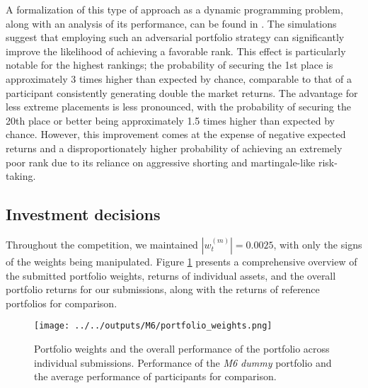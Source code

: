 \documentclass[3p,times,twocolumn]{elsarticle}
\begin{document}
A formalization of this type of approach as a dynamic programming problem, along with an analysis of its performance, can be found in \citep{stanekNoteM6Forecasting2023a}.
The simulations suggest that employing such an adversarial portfolio strategy can significantly improve the likelihood of achieving a favorable rank.
This effect is particularly notable for the highest rankings; the probability of securing the 1st place is approximately 3 times higher than expected by chance, comparable to that of a participant consistently generating double the market returns.
The advantage for less extreme placements is less pronounced, with the probability of securing the 20th place or better being approximately 1.5 times higher than expected by chance.
However, this improvement comes at the expense of negative expected returns and a disproportionately higher probability of achieving an extremely poor rank due to its reliance on aggressive shorting and martingale-like risk-taking.

\subsection{Investment decisions}\label{subsection:decisions}

Throughout the competition, we maintained $|w_{t}^{(m)}|=0.0025$, with only the signs of the weights being manipulated. 
Figure \ref{fig:portfolio_weights} presents a comprehensive overview of the submitted portfolio weights, returns of individual assets, and the overall portfolio returns for our submissions, along with the returns of reference portfolios for comparison.

\begin{figure}[!htbp]
    \centering
    \texttt{[image: ../../outputs/M6/portfolio\_weights.png]}
    \caption{
        Portfolio weights and the overall performance of the portfolio across individual submissions. Performance of the \emph{M6 dummy} portfolio and the average performance of participants for comparison.
    }
    \label{fig:portfolio_weights}
\end{figure}
\end{document}
